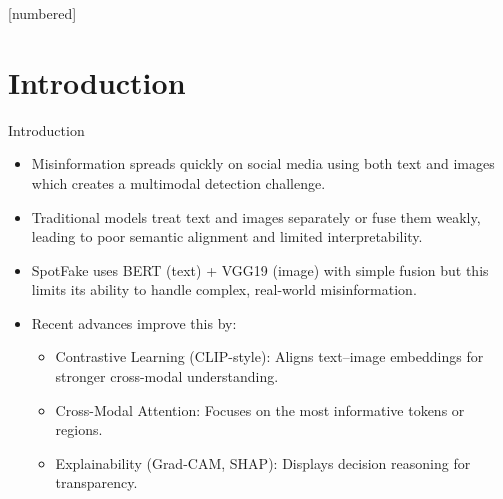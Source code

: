 \documentclass[xcolor=dvipsnames,aspectratio=169]{beamer}
\begin{document}
[numbered]









\section{Introduction}
\begin{frame}{Introduction}

	\begin{itemize}
		\item Misinformation spreads quickly on social media using both text and images which creates a multimodal detection challenge. \\
        
        \item Traditional models treat text and images separately or fuse them weakly, leading to poor semantic alignment and limited interpretability.\\
        
        \item SpotFake uses BERT (text) + VGG19 (image) with simple fusion but this limits its ability to handle complex, real-world misinformation. \\
        
        \item Recent advances improve this by:
        \begin{itemize}
            \item Contrastive Learning (CLIP-style): Aligns text–image embeddings for stronger cross-modal understanding.
            \item Cross-Modal Attention: Focuses on the most informative tokens or regions.
            \item Explainability (Grad-CAM, SHAP): Displays decision reasoning for transparency.
        \end{itemize}
	\end{itemize}
\end{frame}
\end{document}

